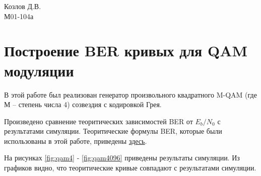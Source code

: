 \documentclass[a4paper, 14pt]{extarticle}
\begin{document}
\begin{flushright}
	Козлов Д.В.\\М01-104а	
\end{flushright}


\section*{Построение BER кривых для QAM модуляции}
 
В этой работе был реализован генератор произвольного
квадратного M-QAM (где М -- степень числа 4) созвездия
с кодировкой Грея.

Произведено сравнение теоритических зависимостей
BER от $E_b/N_0$ с результатами симуляции.
Теоритические формулы BER, которые были
использованы в этой работе, приведены
\href{https://www.mathworks.com/help/comm/ug/
analytical-expressions-used-in-berawgn-function
-and-bit-error-rate-analysis-app.html}{\underline{здесь}}.

На рисунках \ref{fig:qam4} - \ref{fig:qam4096} приведены
результаты симуляции. Из графиков видно, что теоритические
кривые совпадают с результатами симуляции.
\end{document}
